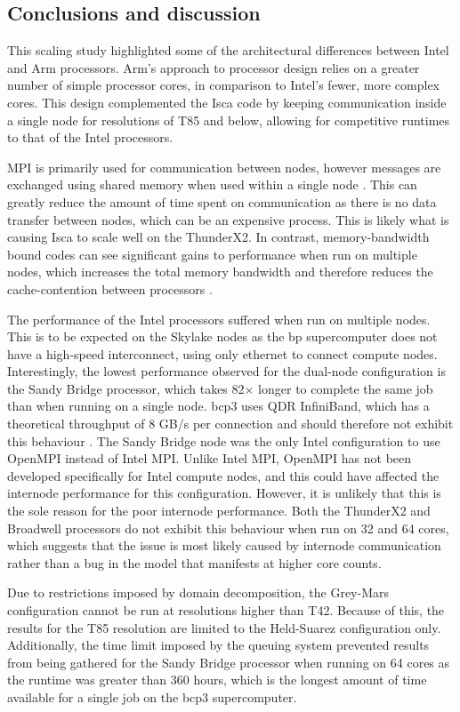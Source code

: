 \documentclass[a4paper,11pt]{report}
\begin{document}
\subsection{Conclusions and discussion}
This scaling study highlighted some of the architectural differences between Intel and Arm processors. Arm's approach to processor design relies on a greater number of simple processor cores, in comparison to Intel's fewer, more complex cores. This design complemented the Isca code by keeping communication inside a single node for resolutions of T85 and below, allowing for competitive runtimes to that of the Intel processors. 
\par
MPI is primarily used for communication between nodes, however messages are exchanged using shared memory when used within a single node \cite{mpi2015standard}. This can greatly reduce the amount of time spent on communication as there is no data transfer between nodes, which can be an expensive process. This is likely what is causing Isca to scale well on the ThunderX2. In contrast, memory-bandwidth bound codes can see significant gains to performance when run on multiple nodes, which increases the total memory bandwidth and therefore reduces the cache-contention between processors \cite{milfeld2014hpc}.
\par
The performance of the Intel processors suffered when run on multiple nodes. This is to be expected on the Skylake nodes as the \gls{bp} supercomputer does not have a high-speed interconnect, using only ethernet to connect compute nodes. Interestingly, the lowest performance observed for the dual-node configuration is the Sandy Bridge processor, which takes 82$\times$ longer to complete the same job than when running on a single node. \gls{bcp3} uses QDR InfiniBand, which has a theoretical throughput of 8 GB/s per connection and should therefore not exhibit this behaviour \cite{grun2010introduction}. The Sandy Bridge node was the only Intel configuration to use OpenMPI instead of Intel MPI. Unlike Intel MPI, OpenMPI has not been developed specifically for Intel compute nodes, and this could have affected the internode performance for this configuration. However, it is unlikely that this is the sole reason for the poor internode performance. Both the ThunderX2 and Broadwell processors do not exhibit this behaviour when run on 32 and 64 cores, which suggests that the issue is most likely caused by internode communication rather than a bug in the model that manifests at higher core counts.
\par
Due to restrictions imposed by domain decomposition, the Grey-Mars configuration cannot be run at resolutions higher than T42. Because of this, the results for the T85 resolution are limited to the Held-Suarez configuration only. Additionally, the time limit imposed by the queuing system prevented results from being gathered for the Sandy Bridge processor when running on 64 cores as the runtime was greater than 360 hours, which is the longest amount of time available for a single job on the \gls{bcp3} supercomputer.
\end{document}
